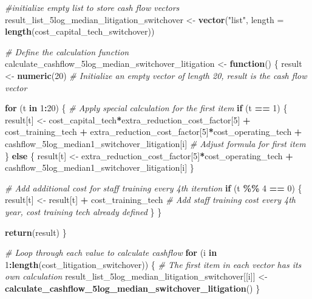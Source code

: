 \documentclass[
]{article}
\newenvironment{Shaded}{\begin{snugshade}}{\end{snugshade}}
\newcommand{\AttributeTok}[1]{\textcolor[rgb]{0.13,0.29,0.53}{#1}}
\newcommand{\CommentTok}[1]{\textcolor[rgb]{0.56,0.35,0.01}{\textit{#1}}}
\newcommand{\ControlFlowTok}[1]{\textcolor[rgb]{0.13,0.29,0.53}{\textbf{#1}}}
\newcommand{\DecValTok}[1]{\textcolor[rgb]{0.00,0.00,0.81}{#1}}
\newcommand{\FunctionTok}[1]{\textcolor[rgb]{0.13,0.29,0.53}{\textbf{#1}}}
\newcommand{\NormalTok}[1]{#1}
\newcommand{\OtherTok}[1]{\textcolor[rgb]{0.56,0.35,0.01}{#1}}
\newcommand{\SpecialCharTok}[1]{\textcolor[rgb]{0.81,0.36,0.00}{\textbf{#1}}}
\newcommand{\StringTok}[1]{\textcolor[rgb]{0.31,0.60,0.02}{#1}}
\begin{document}
\begin{Shaded}
\begin{Highlighting}[]
\CommentTok{\#initialize empty list to store cash flow vectors}
\NormalTok{result\_list\_5log\_median\_litigation\_switchover }\OtherTok{\textless{}{-}} \FunctionTok{vector}\NormalTok{(}\StringTok{"list"}\NormalTok{, }\AttributeTok{length =} \FunctionTok{length}\NormalTok{(cost\_capital\_tech\_switchover))}


\CommentTok{\# Define the calculation function}
\NormalTok{calculate\_cashflow\_5log\_median\_switchover\_litigation }\OtherTok{\textless{}{-}} \ControlFlowTok{function}\NormalTok{() \{}
\NormalTok{  result }\OtherTok{\textless{}{-}} \FunctionTok{numeric}\NormalTok{(}\DecValTok{20}\NormalTok{)  }\CommentTok{\# Initialize an empty vector of length 20, result is the cash flow vector}
  
  \ControlFlowTok{for}\NormalTok{ (t }\ControlFlowTok{in} \DecValTok{1}\SpecialCharTok{:}\DecValTok{20}\NormalTok{) \{}
    \CommentTok{\# Apply special calculation for the first item}
    \ControlFlowTok{if}\NormalTok{ (t }\SpecialCharTok{==} \DecValTok{1}\NormalTok{) \{}
\NormalTok{      result[t] }\OtherTok{\textless{}{-}}\NormalTok{ cost\_capital\_tech}\SpecialCharTok{*}\NormalTok{extra\_reduction\_cost\_factor[}\DecValTok{5}\NormalTok{] }\SpecialCharTok{+}\NormalTok{ cost\_training\_tech }\SpecialCharTok{+}\NormalTok{ extra\_reduction\_cost\_factor[}\DecValTok{5}\NormalTok{]}\SpecialCharTok{*}\NormalTok{cost\_operating\_tech }\SpecialCharTok{+}\NormalTok{ cashflow\_5log\_median1\_switchover\_litigation[i] }\CommentTok{\# Adjust formula for first item}
\NormalTok{    \} }\ControlFlowTok{else}\NormalTok{ \{}
\NormalTok{      result[t] }\OtherTok{\textless{}{-}}\NormalTok{ extra\_reduction\_cost\_factor[}\DecValTok{5}\NormalTok{]}\SpecialCharTok{*}\NormalTok{cost\_operating\_tech }\SpecialCharTok{+}\NormalTok{ cashflow\_5log\_median1\_switchover\_litigation[i]}
\NormalTok{    \}}
    
    \CommentTok{\# Add additional cost for staff training every 4th iteration}
    \ControlFlowTok{if}\NormalTok{ (t }\SpecialCharTok{\%\%} \DecValTok{4} \SpecialCharTok{==} \DecValTok{0}\NormalTok{) \{}
\NormalTok{      result[t] }\OtherTok{\textless{}{-}}\NormalTok{ result[t] }\SpecialCharTok{+}\NormalTok{ cost\_training\_tech  }\CommentTok{\# Add staff training cost every 4th year, cost training tech already defined}
\NormalTok{    \}}
\NormalTok{  \}}
  
  \FunctionTok{return}\NormalTok{(result)}
\NormalTok{\}}

\CommentTok{\# Loop through each value to calculate cashflow}
\ControlFlowTok{for}\NormalTok{ (i }\ControlFlowTok{in} \DecValTok{1}\SpecialCharTok{:}\FunctionTok{length}\NormalTok{(cost\_litigation\_switchover)) \{}
  \CommentTok{\# The first item in each vector has its own calculation}
\NormalTok{  result\_list\_5log\_median\_litigation\_switchover[[i]] }\OtherTok{\textless{}{-}} \FunctionTok{calculate\_cashflow\_5log\_median\_switchover\_litigation}\NormalTok{()}
\NormalTok{\}}



\end{Highlighting}
\end{Shaded}
\end{document}
